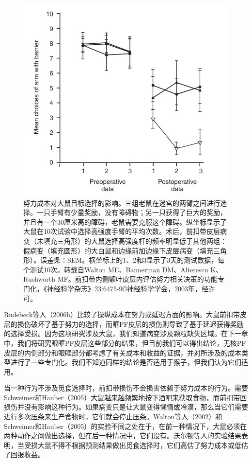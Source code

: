 \begin{figure}[!htb]
	\centering
	\includegraphics{image_pfc/Fig_3_7}
	\caption{努力成本对大鼠目标选择的影响。三组老鼠在迷宫的两臂之间进行选择。一只手臂有少量奖励，没有障碍物；另一只获得了巨大的奖励，并且有一个30厘米高的障碍，老鼠需要克服这个障碍。纵坐标显示了大鼠在10次试验中选择高强度手臂的平均次数。术后，前扣带皮层病变（未填充三角形）的大鼠选择高强度杆的频率明显低于其他两组：假病变（填充圆形）的大白鼠和边缘前加边缘下皮层病变（填充三角形）。误差条：SEM。横坐标上的1、2和3显示了3天的测试数据，每个测试10次。转载自Walton ME、Bannerman DM、Alterescu K、Rushworth MF。前扣带内侧额叶皮层内评估努力相关决策的功能专门化，《神经科学杂志》23:6475-9©神经科学学会，2003年，经许可。}
	\label{fig:fig}
\end{figure}
Rudebeck等人（2006b）比较了操纵成本在努力或延迟方面的影响。大鼠前扣带皮层的损伤破坏了基于努力的选择，而眶PF皮层的损伤则导致了基于延迟获得奖励的选择受损。因为这项研究涉及大鼠，我们知道病变涉及颗粒缺失区域。在下一章中，我们将研究眼眶PF皮层这些部分的结果，但目前我们可以得出结论，无核PF皮层的内侧部分和眼眶部分都考虑了有关成本和收益的证据，并对所涉及的成本类型进行了一些专门化。我们不知道同样的结论是否适用于猴子，但我们认为它们适用。\par
当一种行为不涉及觅食选择时，前扣带损伤不会损害依赖于努力成本的行为。需要Schweimer和Hauber（2005）大鼠越来越频繁地按下酒吧来获取食物，而前扣带回损伤并没有影响这种行为。如果病变只是让大鼠变得懒惰或冷漠，那么当它们需要进行多次压条来生产食物时，它们就会停止压条。Walton等人（2002）和Schweimer和Hauber（2005）的实验不同之处在于，在前一种情况下，大鼠必须在两种动作之间做出选择，但在后一种情况中，它们没有。沃尔顿等人的实验结果表明，当受损大鼠不得不根据预测结果做出觅食选择时，它们高估了努力成本或低估了回报收益。\par
